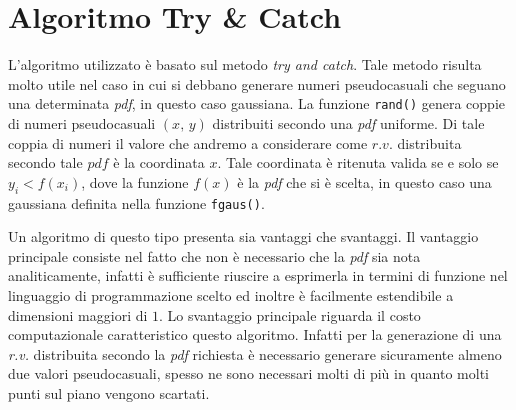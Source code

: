 \appendix

\section{Algoritmo Try \& Catch}


L'algoritmo utilizzato è basato sul metodo \textit{try and catch}. Tale metodo risulta molto utile nel caso in cui si debbano generare numeri pseudocasuali che seguano una determinata \textit{pdf}, in questo caso gaussiana. La funzione \verb+rand()+ genera coppie di numeri pseudocasuali $(x,\,y)$ distribuiti secondo una \textit{pdf} uniforme. Di tale coppia di numeri il valore che andremo a considerare come $r.v.$ distribuita secondo tale $pdf$ è la coordinata $x$. Tale coordinata è ritenuta valida se e solo se $y_i < f(x_i)$, dove la funzione $f(x)$ è la \textit{pdf} che si è scelta, in questo caso una gaussiana definita nella funzione \verb+fgaus()+.


Un algoritmo di questo tipo presenta sia vantaggi che svantaggi. Il vantaggio principale consiste nel fatto che non è necessario che la \textit{pdf} sia nota analiticamente, infatti è sufficiente riuscire a esprimerla in termini di funzione nel linguaggio di programmazione scelto ed inoltre è facilmente estendibile a dimensioni maggiori di $1$. Lo svantaggio principale riguarda il costo computazionale caratteristico questo algoritmo. Infatti per la generazione di una \textit{r.v.} distribuita secondo la \textit{pdf} richiesta è necessario generare sicuramente almeno due valori pseudocasuali, spesso ne sono necessari molti di più in quanto molti punti sul piano vengono scartati.